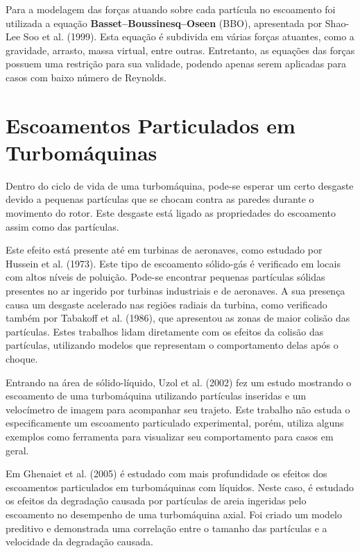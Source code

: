 Para a modelagem das forças atuando sobre cada partícula no escoamento foi utilizada a equação \textbf{Basset–Boussinesq–Oseen} (BBO), apresentada por Shao-Lee Soo et al. (1999)\cite{ShaoLeeSoo-1999}.
Esta equação é subdivida em várias forças atuantes, como a gravidade, arrasto, massa virtual, entre outras.
Entretanto, as equações das forças possuem uma restrição para sua validade, podendo apenas serem aplicadas para casos com baixo número de Reynolds.


\section{\textbf{Escoamentos Particulados em Turbomáquinas}}
\label{sec_rev_EP}
Dentro do ciclo de vida de uma turbomáquina, pode-se esperar um certo desgaste devido a pequenas partículas que se chocam contra as paredes durante o movimento do rotor.
Este desgaste está ligado as propriedades do escoamento assim como das partículas.

Este efeito está presente até em turbinas de aeronaves, como estudado por Hussein et al. (1973)\cite{Hussein-1973}.
Este tipo de escoamento sólido-gás é verificado em locais com altos níveis de poluição.
Pode-se encontrar pequenas partículas sólidas presentes no ar ingerido por turbinas industriais e de aeronaves.
A sua presença causa um desgaste acelerado nas regiões radiais da turbina, como verificado também por Tabakoff et al. (1986)\cite{Tabakoff-1986}, que apresentou as zonas de maior colisão das partículas.
Estes trabalhos lidam diretamente com os efeitos da colisão das partículas, utilizando modelos que representam o comportamento delas após o choque.

Entrando na área de sólido-líquido, Uzol et al. (2002)\cite{Uzol-2002} fez um estudo mostrando o escoamento de uma turbomáquina utilizando partículas inseridas e um velocímetro de imagem para acompanhar seu trajeto.
Este trabalho não estuda o especificamente um escoamento particulado experimental, porém, utiliza alguns exemplos como ferramenta para visualizar seu comportamento para casos em geral.

Em Ghenaiet et al. (2005)\cite{Ghenaiet-2005} é estudado com mais profundidade os efeitos dos escoamentos particulados em turbomáquinas com líquidos.
Neste caso, é estudado os efeitos da degradação causada por partículas de areia ingeridas pelo escoamento no desempenho de uma turbomáquina axial.
Foi criado um modelo preditivo e demonstrada uma correlação entre o tamanho das partículas e a velocidade da degradação causada.

